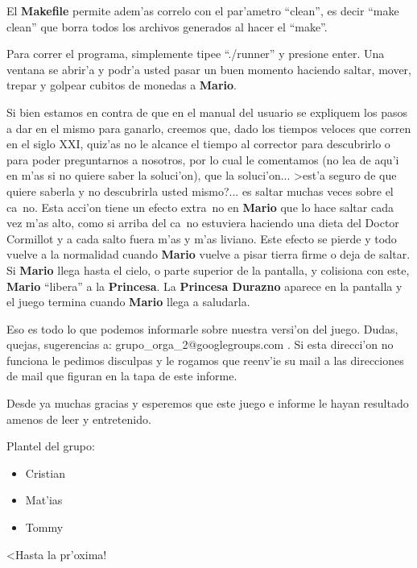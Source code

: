 	El \textbf{Makefile} permite adem'as correlo con el par'ametro ``clean'',
es decir ``make clean'' que borra todos los archivos generados al hacer el
``make''.

	Para correr el programa, simplemente tipee ``./runner'' y presione enter.
Una ventana se abrir'a y podr'a usted pasar un buen momento haciendo saltar,
mover, trepar y golpear cubitos de monedas a \textbf{Mario}.

	Si bien estamos en contra de que en el manual del usuario se expliquem los
pasos a dar en el mismo para ganarlo, creemos que, dado los tiempos veloces
que corren en el siglo XXI, quiz'as no le alcance el tiempo al corrector para
descubrirlo o para poder preguntarnos a nosotros, por lo cual le comentamos (no
lea de aqu'i en m'as si no quiere saber la soluci'on), que la soluci'on...
>est'a seguro de que quiere saberla y no descubrirla usted mismo?... es saltar
muchas veces sobre el ca~no. Esta acci'on tiene un efecto extra~no en
\textbf{Mario} que
lo hace saltar cada vez m'as alto, como si arriba del ca~no estuviera haciendo
una dieta del Doctor Cormillot y a cada salto fuera m'as y m'as liviano. Este
efecto se pierde y todo vuelve a la normalidad cuando \textbf{Mario} vuelve a pisar
tierra firme o deja de saltar. Si \textbf{Mario} llega hasta el cielo, o parte superior
de la pantalla, y colisiona con este, \textbf{Mario} ``libera'' a la
\textbf{Princesa}. La \textbf{Princesa Durazno} aparece en la pantalla y el
juego termina cuando \textbf{Mario} llega a saludarla.

	Eso es todo lo que podemos informarle sobre nuestra versi'on del juego.
Dudas, quejas, sugerencias a: grupo\_orga\_2@googlegroups.com . Si esta
direcci'on no funciona le pedimos disculpas y le rogamos que reenv'ie su mail a
las direcciones de mail que figuran en la tapa de este informe. 

	Desde ya muchas gracias y esperemos que este juego e informe le hayan
resultado amenos de leer y entretenido.

	Plantel del grupo:
\begin{itemize}
 \item Cristian
 \item Mat'ias
 \item Tommy
\end{itemize}

	<Hasta la pr'oxima!
